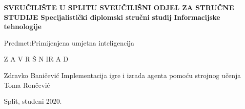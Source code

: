 %
%
\begin{titlepage}
	\bfseries
	\headerdata
	{SVEUČILIŠTE U SPLITU}
	{SVEUČILIŠNI ODJEL ZA STRUČNE STUDIJE}
	{Specijalistički diplomski stručni studij Informacijske tehnologije}
	
	\vspace*{5cm}
	\begin{flushleft}
		{\large   Predmet:\normalfont\space Primijenjena umjetna inteligencija}
	\end{flushleft}
	\vspace*{3cm}
	
	\begin{center}
		{\LARGE {Z A V R Š N I\space\space\space R A D}}
	\end{center}
	\vspace*{2cm}
	
	\thesisdata
	{Zdravko Baničević}
	{Implementacija igre i izrada agenta pomoću strojnog učenja}
	{Toma Rončević}
	
	\begin{center}
		\vfill
		{\large\normalfont Split, studeni 2020.}
	\end{center}
\end{titlepage}
%
%